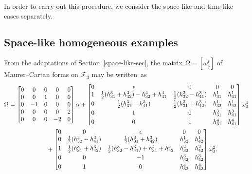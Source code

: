 \documentclass[10pt,a4paper]{amsart}
\numberwithin{equation}{section}
\theoremstyle{definition}
\begin{document}
In order to carry out this procedure, we consider the space-like and time-like cases separately.

\subsection{Space-like homogeneous examples}

From the adaptations of Section~\ref{space-like-sec}, the matrix $\Omega = [\omega^i_j]$ of Maurer--Cartan forms on
$\mathcal{F}_3$ may be written~as
\begin{gather}
\Omega =
\begin{bmatrix}
0 & 0 & 0 & 0 & 0
\\
0 & 0 & 1 & 0 & 0
\\
0 & -1 & 0 & 0 & 0
\\
0 & 0 & 0 & 0 & 2
\\
0 & 0 & 0 & -2 & 0
\end{bmatrix}
\alpha
+
\begin{bmatrix}
0 & \epsilon & 0 & 0 & 0
\\
1 & \tfrac{1}{2}(h^3_{31} + h^3_{42}) - h^4_{32} + h^4_{41} & \tfrac{1}{2}(h^3_{32} - h^3_{41}) & h^1_{31} &
h^1_{41}
\vspace{1mm}\\
0 & \tfrac{1}{2}(h^3_{32} - h^3_{41}) & \tfrac{1}{2}(h^3_{31} + h^3_{42}) & h^1_{32} & h^1_{42}
\vspace{1mm}\\
0 & 1 & 0 & h^3_{31} & h^3_{41}
\vspace{1mm}\\
0 & 0 & 1 & h^4_{31} & h^4_{41}
\end{bmatrix}
\omega^1_0
\nonumber
\\
\phantom{\Omega =}{}
+
\begin{bmatrix}
0 & 0 & \epsilon & 0 & 0
\\
0 & \tfrac{1}{2}(h^3_{32} - h^3_{41}) & \tfrac{1}{2}(h^3_{31} + h^3_{42}) & h^1_{32} & h^1_{42}
\vspace{1mm}\\
1 & \tfrac{1}{2}(h^3_{31} + h^3_{42}) & \tfrac{1}{2}(h^3_{32} - h^3_{41}) + h^4_{31} + h^4_{42} & h^2_{32} &
h^2_{42}
\vspace{1mm}\\
0 & 0 & -1 & h^3_{32} & h^3_{42}
\vspace{1mm}\\
0 & 1 & 0 & h^4_{32} & h^4_{42}
\end{bmatrix}
\omega^2_0,
\label{space-like-reduced-MC-form}
\end{gather}
\end{document}
